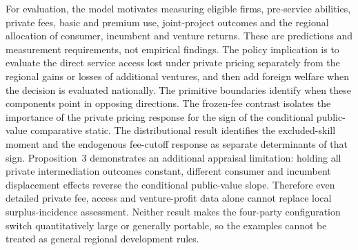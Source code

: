For evaluation, the model motivates measuring eligible firms, pre-service abilities, private fees, basic and premium use, joint-project outcomes and the regional allocation of consumer, incumbent and venture returns. These are predictions and measurement requirements, not empirical findings. The policy implication is to evaluate the direct service access lost under private pricing separately from the regional gains or losses of additional ventures, and then add foreign welfare when the decision is evaluated nationally. The primitive boundaries identify when these components point in opposing directions. The frozen-fee contrast isolates the importance of the private pricing response for the sign of the conditional public-value comparative static. The distributional result identifies the excluded-skill moment and the endogenous fee-cutoff response as separate determinants of that sign. Proposition~3 demonstrates an additional appraisal limitation: holding all private intermediation outcomes constant, different consumer and incumbent displacement effects reverse the conditional public-value slope. Therefore even detailed private fee, access and venture-profit data alone cannot replace local surplus-incidence assessment. Neither result makes the four-party configuration switch quantitatively large or generally portable, so the examples cannot be treated as general regional development rules.

